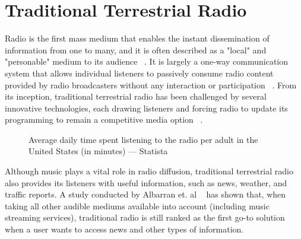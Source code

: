 


\section{Traditional Terrestrial Radio}
Radio is the first mass medium that enables the instant dissemination of information from one to many, and it is often described as a "local" and "personable" medium to its audience ~\cite{Ren2004}. It is largely a one-way communication system that allows individual listeners to passively consume radio content provided by radio broadcasters without any interaction or participation ~\cite{Gazi2011}. From its inception, traditional terrestrial radio has been challenged by several innovative technologies, each drawing listeners and forcing radio to update its programming to remain a competitive media option ~\cite{Albarran2007}. 

\begin{figure}
 \centering
\caption{Average daily time spent listening to the radio per adult in the United States (in minutes) —  Statista}
\label{fig:test_env}
\end{figure}


Although music plays a vital role in radio diffusion, traditional terrestrial radio also provides its listeners with useful information, such as news, weather, and traffic reports. A study conducted by Albarran et. al ~\cite{Albarran2007} has shown that, when taking all other audible mediums available into account (including music streaming services), traditional radio is still ranked as the first go-to solution when a user wants to access news and other types of information. 


